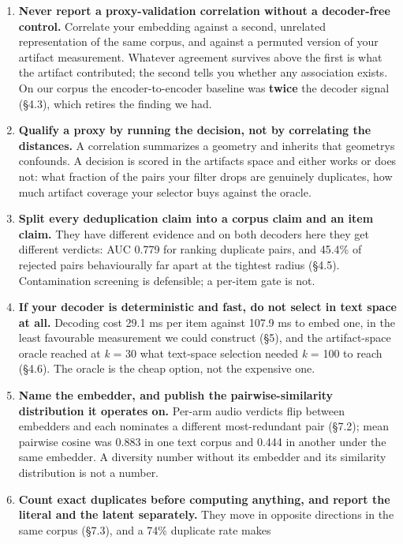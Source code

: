 \documentclass[
  10pt,
]{article}
\providecommand{\tightlist}{%
  \setlength{\itemsep}{0pt}\setlength{\parskip}{0pt}}
\theoremstyle{plain}
\theoremstyle{definition}
\providecommand{\tightlist}{\setlength{\itemsep}{0pt}\setlength{\parskip}{0pt}}
\begin{document}
\begin{enumerate}
\def\labelenumi{\arabic{enumi}.}
\tightlist
\item
  \textbf{Never report a proxy-validation correlation without a
  decoder-free control.} Correlate your embedding against a second,
  unrelated representation of the same corpus, and against a permuted
  version of your artifact measurement. Whatever agreement survives
  above the first is what the artifact contributed; the second tells you
  whether any association exists. On our corpus the encoder-to-encoder
  baseline was \textbf{twice} the decoder signal (§4.3), which retires
  the finding we had.
\item
  \textbf{Qualify a proxy by running the decision, not by correlating
  the distances.} A correlation summarizes a geometry and inherits that
  geometry\textquotesingle s confounds. A decision is scored in the
  artifact\textquotesingle s space and either works or does not: what
  fraction of the pairs your filter drops are genuinely duplicates, how
  much artifact coverage your selector buys against the oracle.
\item
  \textbf{Split every deduplication claim into a corpus claim and an
  item claim.} They have different evidence and on both decoders here
  they get different verdicts: AUC 0.779 for ranking duplicate pairs,
  and 45.4\% of rejected pairs behaviourally far apart at the tightest
  radius (§4.5). Contamination screening is defensible; a per-item gate
  is not.
\item
  \textbf{If your decoder is deterministic and fast, do not select in
  text space at all.} Decoding cost 29.1 ms per item against 107.9 ms to
  embed one, in the least favourable measurement we could construct
  (§5), and the artifact-space oracle reached at \emph{k} = 30 what
  text-space selection needed \emph{k} = 100 to reach (§4.6). The oracle
  is the cheap option, not the expensive one.
\item
  \textbf{Name the embedder, and publish the pairwise-similarity
  distribution it operates on.} Per-arm audio verdicts flip between
  embedders and each nominates a different most-redundant pair (§7.2);
  mean pairwise cosine was 0.883 in one text corpus and 0.444 in another
  under the same embedder. A diversity number without its embedder and
  its similarity distribution is not a number.
\item
  \textbf{Count exact duplicates before computing anything, and report
  the literal and the latent separately.} They move in opposite
  directions in the same corpus (§7.3), and a 74\% duplicate rate makes

\end{enumerate}
\end{document}
